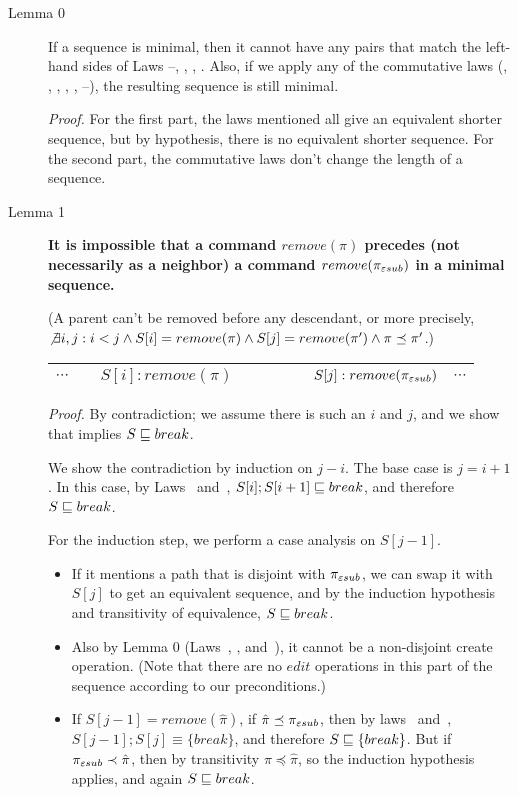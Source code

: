 \begin{description}
\item[Lemma 0]
If a sequence is minimal, then it cannot have any pairs that match the
left-hand sides of Laws \lawx--\lawxxxv, \lawiia, \lawiiap, \lawiiib.
Also, if we apply any of the
commutative laws 
(\lawi, \lawip, \lawiib, \lawiiia, \lawiiiap, \lawiv--\lawix),
the resulting sequence is still minimal.

\emph{Proof.}
For the first part, the laws mentioned all give an equivalent shorter
sequence, but by hypothesis, there is no equivalent shorter sequence.
For the second part, the commutative laws don't change the length of a
sequence.

\item[Lemma 1] {\bf It is impossible that a command
\(remove(\pi)\) precedes (not necessarily as a neighbor) a command
\(remove(\pi_{\varepsilon sub})\) in a minimal sequence.} 
\begin{notrsi}
(A parent can't be removed before any descendant, or
more precisely, \(\not\exists i,j: i<j \land S[i] = remove(\pi) \land
S[j] = remove(\pi') \land \pi \preceq \pi'\).)
\end{notrsi}
\begin{notrsi}
\begin{center}
\begin{tabular}{c|c|c|c|c|c|c|c|c}
\hline
\(\cdots\) & & \(S[i]: remove(\pi)\) & & & & &
\(S[j]: remove(\pi_{\varepsilon sub})\) & \(\cdots\) \\
\hline
\end{tabular}
\end{center}
\end{notrsi}
\emph{Proof.}
By contradiction; we assume there is such an \(i\) and \(j\), and we show
that implies \(S \sqsubseteq break\).

We show the contradiction by induction on \(j-i\).
The base case is \(j = i+1\).
In this case, by Laws \lawxxii~and~\lawxxiii, 
\(S[i]; S[i+1] \sqsubseteq break\),
and therefore \(S\sqsubseteq break\).

For the induction step, we perform a case analysis on \(S[j-1]\).
\begin{itemize}
\item
If it mentions a path that is disjoint with \(\pi_{\varepsilon sub}\),
we can swap it
with \(S[j]\) to get an equivalent sequence, and by the induction   
hypothesis and transitivity of equivalence, \(S\sqsubseteq break\).
\item
Also by Lemma 0 (Laws~\lawxvi, \lawxvii, and~\lawxxvii), it cannot be a
non-disjoint create operation. (Note that there are no \(edit\) operations
in this part of the sequence according to our preconditions.)
\item
If $S[j-1] =remove(\hat\pi)$, if $\hat\pi \preceq \pi_{\varepsilon sub}$, then by laws
\lawxxii~and~\lawxxiii, $S[j-1]; S[j] \equiv \{break\}$, and therefore 
$S\sqsubseteq\{break\}$.
But if $\pi_{\varepsilon sub} \prec \hat\pi$, then by transitivity $\pi \preceq
\hat\pi$, so the induction hypothesis applies, and again 
$S \sqsubseteq break$.
\end{itemize}


\end{description}
